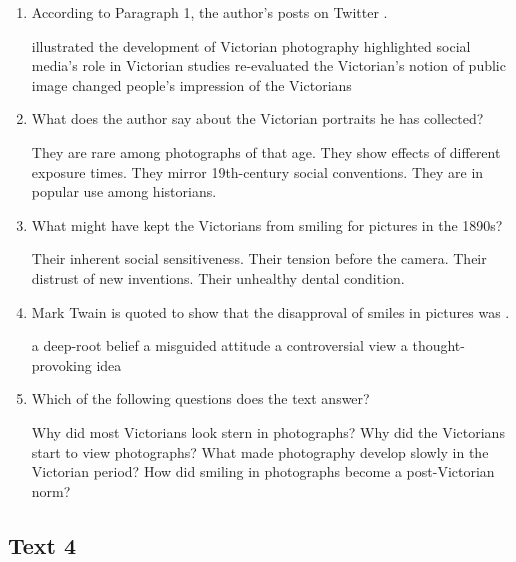 \begin{enumerate}[resume]
	\item
According to Paragraph 1, the author's posts on Twitter \lineread.


\fourchoices
{illustrated the development of Victorian photography}
{highlighted social media's role in Victorian studies}
{re-evaluated the Victorian's notion of public image}
{changed people's impression of the Victorians}


\item
What does the author say about the Victorian portraits he has
collected?


\fourchoices
{They are rare among photographs of that age.}
{They show effects of different exposure times.}
{They mirror 19th-century social conventions.}
{They are in popular use among historians.}



\item
 What might have kept the Victorians from smiling for pictures in the
1890s?


\fourchoices
{Their inherent social sensitiveness.}
{Their tension before the camera.}
{Their distrust of new inventions.}
{Their unhealthy dental condition.}



\item
Mark Twain is quoted to show that the disapproval of smiles in
pictures was \lineread.


\fourchoices
{a deep-root belief}
{a misguided attitude}
{a controversial view}
{a thought-provoking idea}


\item
Which of the following questions does the text answer?


\fourchoices
{Why did most Victorians look stern in photographs?}
{Why did the Victorians start to view photographs?}
{What made photography develop slowly in the Victorian period?}
{How did smiling in photographs become a post-Victorian norm?	}
	
	
\end{enumerate}



\newpage
\subsection{Text 4}



